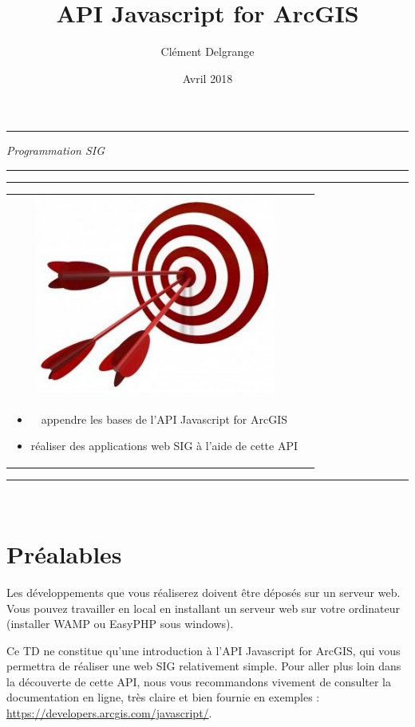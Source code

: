 \documentclass[11pt]{article}
\title{API Javascript for ArcGIS}
\author{Clément Delgrange}
\date{Avril 2018}
\newenvironment{objectifs}{
  \hrule
	\begin{minipage}{0.9\textwidth}
		\vspace{1em}
		\begin{tabular}[t t]{c c}
			\includegraphics[width=0.1\linewidth]{img/goals.jpg} &
			\begin{minipage}[c]{0.8\linewidth}
				\hspace{2em}\textbf{\large{Objectifs :}} \\
}{
			\end{minipage}
		\end{tabular}
		\vspace{1em}
	\end{minipage}
	\hrule
}
\begin{document}
\parindent=0cm


\begin{titlepage}
\makeatletter
	\begin{sffamily}
		\begin{flushleft}
		\end{flushleft}
		\begin{flushright}
		\end{flushright}

		\vspace{4cm}

		\begin{center}
			\hrule
				\vspace{1em}
				{\small \textit{Programmation SIG}}\\
				\vspace{0.5cm}
				{\huge\bfseries \@title}
				\vspace{1cm}
			\hrule

			\vspace{4cm}
			\begin{objectifs}
			\begin{itemize}
				\item appendre les bases de l'API Javascript for ArcGIS
				\item réaliser des applications web SIG à l'aide de cette API
			\end{itemize}
			\end{objectifs}

			\vspace{3cm}

			\large \textit{\@author}\\
			\small \textit{\@date}
		\end{center}
	\end{sffamily}
\makeatother
\end{titlepage}



\section*{Préalables}
Les développements que vous réaliserez doivent être déposés sur un serveur web. 
Vous pouvez travailler en local en installant un serveur web sur votre ordinateur (installer WAMP ou EasyPHP sous windows).

Ce TD ne constitue qu'une introduction à l'API Javascript for ArcGIS, qui vous permettra de réaliser une web SIG relativement simple.
Pour aller plus loin dans la découverte de cette API, nous vous recommandons vivement de consulter la documentation en ligne, très claire et bien fournie en exemples : \url{https://developers.arcgis.com/javascript/}.
\end{document}
